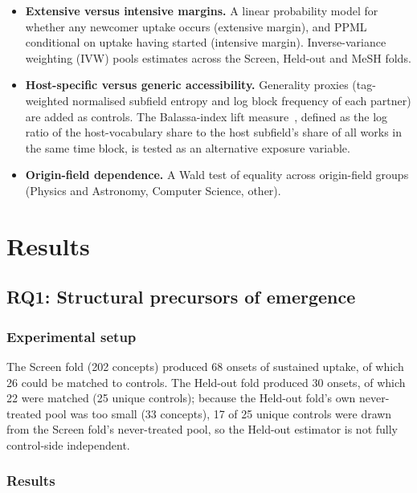 \documentclass[11pt,letterpaper]{article}
\begin{document}
\begin{itemize}
\item \textbf{Extensive versus intensive margins.} A linear probability model for whether any newcomer uptake
occurs (extensive margin), and PPML conditional on uptake having started (intensive margin). Inverse-variance
weighting (IVW) pools estimates across the Screen, Held-out and MeSH folds.

\item \textbf{Host-specific versus generic accessibility.} Generality proxies (tag-weighted normalised subfield
entropy and log block frequency of each partner) are added as controls. The Balassa-index lift
measure~\citep{Balassa1965}, defined as the log ratio of the host-vocabulary share to the host subfield's share of
all works in the same time block, is tested as an alternative exposure variable.

\item \textbf{Origin-field dependence.} A Wald test of equality across origin-field groups (Physics and
Astronomy, Computer Science, other).
\end{itemize}

\section{Results}
\label{sec:results}

\subsection{RQ1: Structural precursors of emergence}
\label{sec:rq1}

\subsubsection{Experimental setup}
\label{sec:rq1_setup}

The Screen fold (202 concepts) produced 68 onsets of sustained uptake, of which 26 could be matched to controls. The Held-out fold produced
30 onsets, of which 22 were matched (25 unique controls); because the Held-out fold's own never-treated pool was too small (33 concepts), 17 of 25 unique
controls were drawn from the Screen fold's never-treated pool, so the Held-out estimator is not fully
control-side independent.

\subsubsection{Results}
\label{sec:rq1_results}
\end{document}
